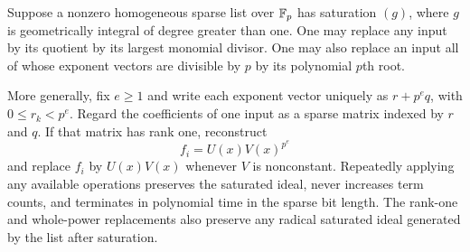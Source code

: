 \begin{lemma}
\label{sp:lem:preprocessing}
Suppose a nonzero homogeneous sparse list over $\mathbb F_p$ has saturation
$(g)$, where $g$ is geometrically integral of degree greater than one.
One may replace any input by its quotient by its largest monomial
divisor. One may also replace an input all of whose exponent vectors
are divisible by $p$ by its polynomial $p$th root.

More generally, fix $e\geq1$ and write each exponent vector uniquely
as $r+p^e q$, with $0\leq r_k<p^e$. Regard the coefficients of one
input as a sparse matrix indexed by $r$ and $q$. If that matrix has
rank one, reconstruct
\[
 f_i=U(x)V(x)^{p^e}
\]
and replace $f_i$ by $U(x)V(x)$ whenever $V$ is nonconstant.
Repeatedly applying any available operations preserves the saturated
ideal, never increases term counts, and terminates in polynomial time
in the sparse bit length. The rank-one and whole-power replacements
also preserve any radical saturated ideal generated by the list after
saturation.
\end{lemma}

